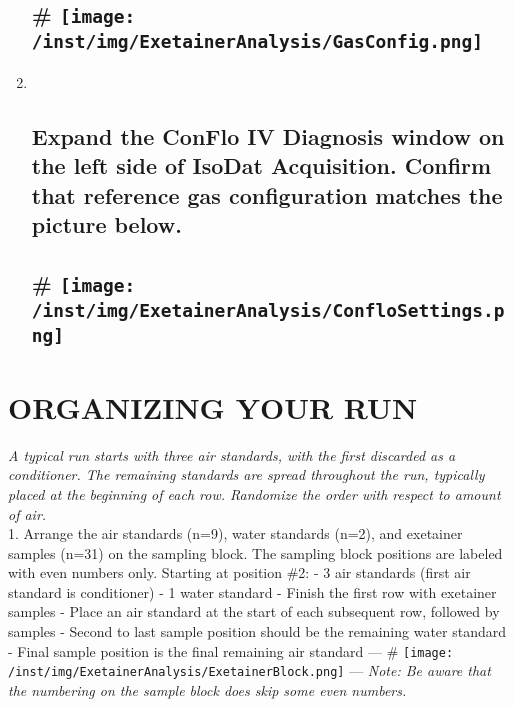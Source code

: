 \documentclass[]{article}
\begin{document}
\begin{enumerate}
  \subsection[\# ]{\texorpdfstring{\#
  \protect\texttt{[image: /inst/img/ExetainerAnalysis/GasConfig.png]}}{\# Reference gas configuration for standard exetainer analysis}}\label{reference-gas-configuration-for-standard-exetainer-analysis}
\item ~
  \subsection{Expand the ConFlo IV Diagnosis window on the left side of
  IsoDat Acquisition. Confirm that reference gas configuration matches
  the picture
  below.}\label{expand-the-conflo-iv-diagnosis-window-on-the-left-side-of-isodat-acquisition.-confirm-that-reference-gas-configuration-matches-the-picture-below.}

  \subsection[\# ]{\texorpdfstring{\#
  \protect\texttt{[image: /inst/img/ExetainerAnalysis/ConfloSettings.png]}}{\# Reference gas configuration for standard exetainer analysis}}\label{reference-gas-configuration-for-standard-exetainer-analysis-1}
\end{enumerate}

\section{ORGANIZING YOUR RUN}\label{organizing-your-run}

\emph{A typical run starts with three air standards, with the first
discarded as a conditioner. The remaining standards are spread
throughout the run, typically placed at the beginning of each row.
Randomize the order with respect to amount of air.}\\
1. Arrange the air standards (n=9), water standards (n=2), and exetainer
samples (n=31) on the sampling block. The sampling block positions are
labeled with even numbers only. Starting at position \#2: - 3 air
standards (first air standard is conditioner) - 1 water standard -
Finish the first row with exetainer samples - Place an air standard at
the start of each subsequent row, followed by samples - Second to last
sample position should be the remaining water standard - Final sample
position is the final remaining air standard --- \#
\texttt{[image: /inst/img/ExetainerAnalysis/ExetainerBlock.png]} ---
\emph{Note: Be aware that the numbering on the sample block does skip
some even numbers.}
\end{document}
